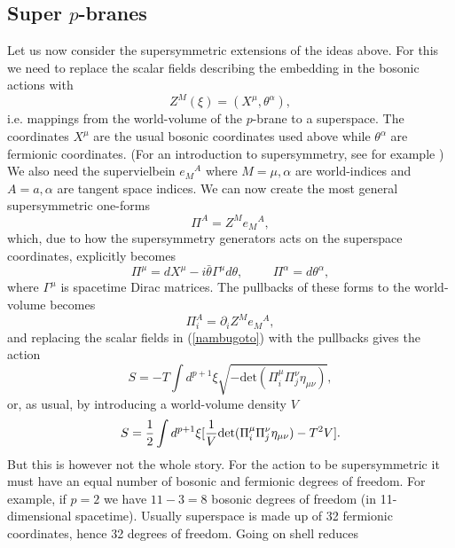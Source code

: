 \subsection{Super $p$-branes}
Let us now consider the supersymmetric extensions of the ideas above. For this we need to replace the scalar fields describing the embedding in the bosonic actions with 
\begin{equation}
Z^{M}(\xi)=(X^{\mu},\theta^{\alpha}),
\end{equation}
i.e. mappings from the world-volume of the $p$-brane to a superspace. The coordinates $X^{\mu}$ are the usual bosonic coordinates used above while $\theta^{\alpha}$ are fermionic coordinates. 
(For an introduction to supersymmetry, see for example \cite{bilal}) We also need the supervielbein $e{_M}^A$ where $M = \mu,\alpha$ are world-indices and $A = a,\alpha$ are tangent space indices. 
We can now create the most general supersymmetric one-forms
\begin{equation}
\Pi^A = Z^Me{_M}^A,
\end{equation}
which, due to how the supersymmetry generators acts on the superspace coordinates, explicitly becomes
\begin{equation}
\Pi^{\mu}=dX^{\mu}-i \bar{\theta} \Gamma^{\mu} d\theta, \hspace{1cm} \Pi^{\alpha} = d\theta^{\alpha},
\label{pullbackfields}
\end{equation}
where $\Gamma^{\mu}$ is spacetime Dirac matrices. The pullbacks of these forms to the world-volume becomes
\begin{equation}
\Pi_{i}^A=\partial_i Z^Me{_M}^A,
\end{equation}
and replacing the scalar fields in (\ref{nambugoto}) with the pullbacks gives the action
\begin{equation}
S=-T\int d^{p+1} \xi \sqrt{-\mbox{det}(\Pi_{i}^{\mu}\Pi_{j}^{\nu} \eta_{\mu \nu})},
\end{equation}
or, as usual, by introducing a world-volume density $V$
\begin{equation}
S={1 \over 2}\int d^{p+1} \xi [{1 \over V}\mbox{det}(\Pi_{i}^{\mu}\Pi_{j}^{\nu} \eta_{\mu \nu})-T^2V].
\label{superaction}
\end{equation}
But this is however not the whole story. For the action to be supersymmetric it must have an equal number of bosonic and fermionic degrees 
of freedom. For example, if $p = 2$ we have $11-3=8$ bosonic degrees of freedom (in 11-dimensional spacetime). Usually superspace is made up of 32 fermionic coordinates, hence 32 degrees of freedom. Going on shell reduces 
